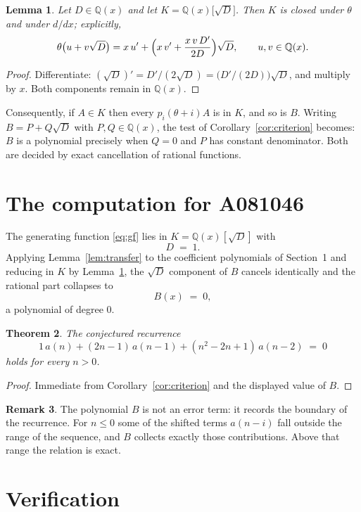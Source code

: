 \documentclass[11pt,a4paper]{article}
\theoremstyle{plain}
\newtheorem{theorem}{Theorem}
\newtheorem{lemma}[theorem]{Lemma}
\theoremstyle{definition}
\newtheorem{remark}[theorem]{Remark}
\begin{document}
\begin{lemma}\label{lem:field}
Let $D\in\mathbb{Q}(x)$ and let $K=\mathbb{Q}(x)\bigl[\sqrt{D}\bigr]$. Then $K$ is closed
under $\theta$ and under $d/dx$; explicitly,
\[
\theta\bigl(u+v\sqrt{D}\bigr)=x\,u'+\Bigl(x\,v'+\frac{x\,v\,D'}{2D}\Bigr)\sqrt{D},
\qquad u,v\in\mathbb{Q}(x).
\]
\end{lemma}

\begin{proof}
Differentiate: $(\sqrt{D})'=D'/(2\sqrt{D})=\bigl(D'/(2D)\bigr)\sqrt{D}$, and multiply by
$x$. Both components remain in $\mathbb{Q}(x)$.
\end{proof}

Consequently, if $A\in K$ then every $p_{i}(\theta+i)A$ is in $K$, and so is $B$. Writing
$B=P+Q\sqrt{D}$ with $P,Q\in\mathbb{Q}(x)$, the test of Corollary~\ref{cor:criterion}
becomes: $B$ is a polynomial precisely when $Q=0$ and $P$ has constant denominator. Both
are decided by exact cancellation of rational functions.

\section{The computation for A081046}

The generating function \eqref{eq:gf} lies in $K=\mathbb{Q}(x)[\sqrt{D}]$ with
\[
D \;=\; 1 .
\]
Applying Lemma~\ref{lem:transfer} to the coefficient polynomials of Section~1 and reducing
in $K$ by Lemma~\ref{lem:field}, the $\sqrt{D}$ component of $B$ cancels identically and
the rational part collapses to
\[
B(x)\;=\;0 ,
\]
a polynomial of degree $0$.

\begin{theorem}
The conjectured recurrence
\[
1\,a(n) + (2 n - 1)\,a(n-1) + (n^{2} - 2 n + 1)\,a(n-2) \;=\;0
\]
holds for every $n>0$.
\end{theorem}

\begin{proof}
Immediate from Corollary~\ref{cor:criterion} and the displayed value of $B$.
\end{proof}

\begin{remark}
The polynomial $B$ is not an error term: it records the boundary of the recurrence. For
$n\le0$ some of the shifted terms $a(n-i)$ fall outside the range of the sequence,
and $B$ collects exactly those contributions. Above that range the relation is exact.
\end{remark}

\section{Verification}
\end{document}
